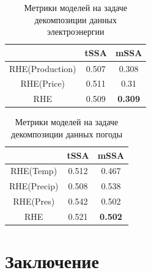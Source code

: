 			\begin{table}[h!]
				\centering
				\caption{Метрики моделей на задаче декомпозиции данных электроэнергии}\label{tab:decomp_electr_results}
				\begin{tabular}{|c|c|c|}
					\hline
					& tSSA  & mSSA           \\ \hline
					RHE(Production) & 0.507 & 0.308          \\ \hline
					RHE(Price)      & 0.511 & 0.31           \\ \hline
					RHE             & 0.509 & \textbf{0.309} \\ \hline
				\end{tabular}
			\end{table}
			
			\begin{table}[h!]
				\centering
				\caption{Метрики моделей на задаче декомпозиции данных погоды}\label{tab:decomp_weather_results}
				\begin{tabular}{|c|c|c|}
					\hline
					& tSSA  & mSSA           \\ \hline
					RHE(Temp)   & 0.512 & 0.467          \\ \hline
					RHE(Precip) & 0.508 & 0.538          \\ \hline
					RHE(Pres)   & 0.542 & 0.502          \\ \hline
					RHE         & 0.521 & \textbf{0.502} \\ \hline
				\end{tabular}
			\end{table}
			
		
	\section{Заключение}
			
		
		\newpage
		\printbibliography
	
